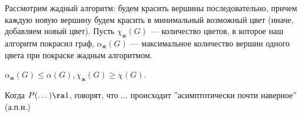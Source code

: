 Рассмотрим жадный алгоритм: будем красить вершины последовательно, причем каждую новую вершину будем красить в минимальный возможный цвет (иначе, добавляем новый цвет). Пусть \(\chi_\text{ж}(G)\) --- количество цветов, в которое наш алгоритм покрасил граф, \(\alpha_\text{ж}(G)\) --- максимальное количество вершин одного цвета при покраске жадным алгоритмом. 

\begin{note}
    \(\alpha_\text{ж}(G) \le \alpha(G), \chi_\text{ж}(G) \ge \chi(G)\).
\end{note}

\begin{note}
    Когда \(P(\dots) \ra 1\), говорят, что \(\dots\) происходит ''асимптотически почти наверное'' (а.п.н.)
\end{note}

